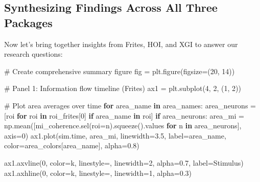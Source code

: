 \documentclass[
  11pt,
  letterpaper,
  oneside,
  openany]{book}
\newenvironment{Shaded}{\begin{snugshade}}{\end{snugshade}}
\newcommand{\CommentTok}[1]{\textcolor[rgb]{0.37,0.37,0.37}{#1}}
\newcommand{\ControlFlowTok}[1]{\textcolor[rgb]{0.00,0.23,0.31}{\textbf{#1}}}
\newcommand{\DecValTok}[1]{\textcolor[rgb]{0.68,0.00,0.00}{#1}}
\newcommand{\FloatTok}[1]{\textcolor[rgb]{0.68,0.00,0.00}{#1}}
\newcommand{\KeywordTok}[1]{\textcolor[rgb]{0.00,0.23,0.31}{\textbf{#1}}}
\newcommand{\NormalTok}[1]{\textcolor[rgb]{0.00,0.23,0.31}{#1}}
\newcommand{\OperatorTok}[1]{\textcolor[rgb]{0.37,0.37,0.37}{#1}}
\newcommand{\StringTok}[1]{\textcolor[rgb]{0.13,0.47,0.30}{#1}}
\begin{document}
\subsection{Synthesizing Findings Across All Three
Packages}\label{synthesizing-findings-across-all-three-packages}

Now let's bring together insights from Frites, HOI, and XGI to answer
our research questions:

\begin{Shaded}
\begin{Highlighting}[]
\CommentTok{\# Create comprehensive summary figure}
\NormalTok{fig }\OperatorTok{=}\NormalTok{ plt.figure(figsize}\OperatorTok{=}\NormalTok{(}\DecValTok{20}\NormalTok{, }\DecValTok{14}\NormalTok{))}

\CommentTok{\# Panel 1: Information flow timeline (Frites)}
\NormalTok{ax1 }\OperatorTok{=}\NormalTok{ plt.subplot(}\DecValTok{4}\NormalTok{, }\DecValTok{2}\NormalTok{, (}\DecValTok{1}\NormalTok{, }\DecValTok{2}\NormalTok{))}

\CommentTok{\# Plot area averages over time}
\ControlFlowTok{for}\NormalTok{ area\_name }\KeywordTok{in}\NormalTok{ area\_names:}
\NormalTok{    area\_neurons }\OperatorTok{=}\NormalTok{ [roi }\ControlFlowTok{for}\NormalTok{ roi }\KeywordTok{in}\NormalTok{ roi\_frites[}\DecValTok{0}\NormalTok{] }\ControlFlowTok{if}\NormalTok{ area\_name }\KeywordTok{in}\NormalTok{ roi]}
    \ControlFlowTok{if}\NormalTok{ area\_neurons:}
\NormalTok{        area\_mi }\OperatorTok{=}\NormalTok{ np.mean([mi\_coherence.sel(roi}\OperatorTok{=}\NormalTok{n).squeeze().values }
                          \ControlFlowTok{for}\NormalTok{ n }\KeywordTok{in}\NormalTok{ area\_neurons], axis}\OperatorTok{=}\DecValTok{0}\NormalTok{)}
\NormalTok{        ax1.plot(sim.time, area\_mi, linewidth}\OperatorTok{=}\FloatTok{3.5}\NormalTok{, }
\NormalTok{                label}\OperatorTok{=}\NormalTok{area\_name, color}\OperatorTok{=}\NormalTok{area\_colors[area\_name], alpha}\OperatorTok{=}\FloatTok{0.8}\NormalTok{)}

\NormalTok{ax1.axvline(}\DecValTok{0}\NormalTok{, color}\OperatorTok{=}\StringTok{\textquotesingle{}k\textquotesingle{}}\NormalTok{, linestyle}\OperatorTok{=}\StringTok{\textquotesingle{}{-}{-}\textquotesingle{}}\NormalTok{, linewidth}\OperatorTok{=}\DecValTok{2}\NormalTok{, alpha}\OperatorTok{=}\FloatTok{0.7}\NormalTok{, label}\OperatorTok{=}\StringTok{\textquotesingle{}Stimulus\textquotesingle{}}\NormalTok{)}
\NormalTok{ax1.axhline(}\DecValTok{0}\NormalTok{, color}\OperatorTok{=}\StringTok{\textquotesingle{}k\textquotesingle{}}\NormalTok{, linestyle}\OperatorTok{=}\StringTok{\textquotesingle{}{-}\textquotesingle{}}\NormalTok{, linewidth}\OperatorTok{=}\DecValTok{1}\NormalTok{, alpha}\OperatorTok{=}\FloatTok{0.3}\NormalTok{)}


\end{Highlighting}
\end{Shaded}
\end{document}
